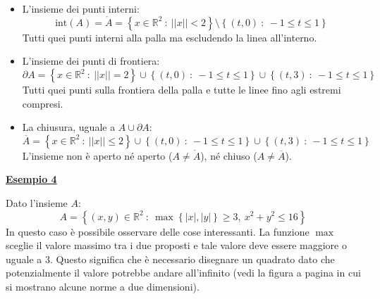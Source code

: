 \documentclass[a4paper]{article}
\newcommand{\example}[1]{\textcolor{Green4}{\textbf{#1}}}
\begin{document}
	\begin{itemize}
		\item L'insieme dei punti interni:
		\begin{equation*}
			\mathrm{int}\left(A\right) = \mathring{A} = \left\{x \in \mathbb{R}^{2} \: : \: || x || < 2\right\} \setminus \left\{\left(t,0\right) \: : \: -1 \le t \le 1\right\}
		\end{equation*}
		Tutti quei punti interni alla palla ma escludendo la linea all'interno.

		\item L'insieme dei punti di frontiera:
		\begin{equation*}
			\partial A = \left\{x \in \mathbb{R}^{2} \: : \: || x || = 2\right\} \cup \left\{\left(t,0\right) \: : \: -1 \le t \le 1\right\} \cup \left\{\left(t,3\right) \: : \: -1 \le t \le 1\right\}
		\end{equation*}
		Tutti quei punti sulla frontiera della palla e tutte le linee fino agli estremi compresi.
		
		\item La chiusura, uguale a $A \cup \partial A$:
		\begin{equation*}
			\overline{A} = \left\{x \in \mathbb{R}^{2} \: : \: || x || \le 2\right\} \cup \left\{\left(t,0\right) \: : \: -1 \le t \le 1\right\} \cup \left\{\left(t,3\right) \: : \: -1 \le t \le 1\right\}
		\end{equation*}
		L'insieme non è aperto né aperto ($A \ne \mathring{A}$), né chiuso ($A \ne \overline{A}$).
	\end{itemize}\newpage

	\begin{flushleft}
		\example{\underline{Esempio 4}}
	\end{flushleft}

	\noindent
	Dato l'insieme $A$:
	\begin{equation*}
		A = \left\{\left(x,y\right) \in \mathbb{R}^{2} \: : \: \max\left\{|x|, |y|\right\} \ge 3, \: x^{2}+y^{2} \le 16\right\}
	\end{equation*}
	In questo caso è possibile osservare delle cose interessanti. La funzione $\max$ sceglie il valore massimo tra i due proposti e tale valore deve essere maggiore o uguale a $3$. Questo significa che è necessario disegnare un quadrato dato che potenzialmente il valore potrebbe andare all'infinito (vedi la figura a pagina \pageref{fig: alcune rappresentazioni di norme in due dimensioni} in cui si mostrano alcune norme a due dimensioni).
\end{document}
